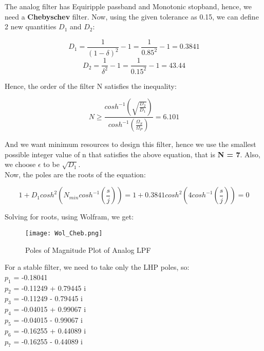 \documentclass{article}
\begin{document}
The analog filter has Equiripple passband and Monotonic stopband, hence, we need a \textbf{Chebyschev} filter. Now, using the given tolerance as 0.15, we can define 2 new quantities $D_1$ and $D_2$:

\begin{center}
    \begin{equation*}
        D_1 = \frac{1}{(1-\delta)^2} - 1 = \frac{1}{0.85^2} - 1 = 0.3841
    \end{equation*}
    \begin{equation*}
        D_2 = \frac{1}{\delta^2} - 1 = \frac{1}{0.15^2} - 1 = 43.44
    \end{equation*}
\end{center}

Hence, the order of the filter N satisfies the inequality:
\begin{center}
    \begin{equation*}
        N \geq \frac{cosh^{-1}(\sqrt{\frac{D_2}{D_1}})}{cosh^{-1}(\frac{\Omega_S}{\Omega_P})} = 6.101
    \end{equation*}
\end{center}

And we want minimum resources to design this filter, hence we use the smallest possible integer value of n that satisfies the above equation, that is \textbf{N = 7}. Also, we choose $\epsilon$ to be $\sqrt{D_1}$.\\

Now, the poles are the roots of the equation:

\begin{center}
    \begin{equation*}
        1+D_1cosh^2(N_{min}cosh^{-1}(\frac{s}{j}))=1+0.3841cosh^2(4cosh^{-1}(\frac{s}{j}))=0
    \end{equation*}
\end{center}

Solving for roots, using Wolfram, we get:

\begin{figure}[h!]

\centering
\texttt{[image: Wol\_Cheb.png]}
\caption{Poles of Magnitude Plot of Analog LPF}
\end{figure}

For a stable filter, we need to take only the LHP poles, so:\\

$p_1$ = -0.18041\\
$p_2$ = -0.11249 + 0.79445 i\\
$p_3$ = -0.11249 - 0.79445 i\\
$p_4$ = -0.04015 + 0.99067 i\\
$p_5$ = -0.04015 - 0.99067 i\\
$p_6$ = -0.16255 + 0.44089 i\\
$p_7$ = -0.16255 - 0.44089 i\\
\end{document}
